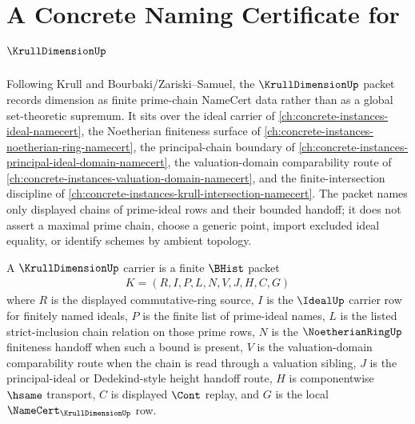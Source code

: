 \chapter{A Concrete Naming Certificate for $\KrullDimensionUp$}
\label{ch:concrete-instances-krull-dimension-namecert}

Following Krull and Bourbaki/Zariski--Samuel, the $\KrullDimensionUp$ packet records dimension as finite prime-chain NameCert data rather than as a global set-theoretic supremum. It sits over the ideal carrier of \autoref{ch:concrete-instances-ideal-namecert}, the Noetherian finiteness surface of \autoref{ch:concrete-instances-noetherian-ring-namecert}, the principal-chain boundary of \autoref{ch:concrete-instances-principal-ideal-domain-namecert}, the valuation-domain comparability route of \autoref{ch:concrete-instances-valuation-domain-namecert}, and the finite-intersection discipline of \autoref{ch:concrete-instances-krull-intersection-namecert}. The packet names only displayed chains of prime-ideal rows and their bounded handoff; it does not assert a maximal prime chain, choose a generic point, import excluded ideal equality, or identify schemes by ambient topology.

\begin{definition}\label{def:krull-dimension-carrier}
A $\KrullDimensionUp$ carrier is a finite $\BHist$ packet
$$
\begin{gathered}
K=(R,I,P,L,N,V,J,H,C,G)
\end{gathered}
$$
where $R$ is the displayed commutative-ring source, $I$ is the $\IdealUp$ carrier row for finitely named ideals, $P$ is the finite list of prime-ideal names, $L$ is the listed strict-inclusion chain relation on those prime rows, $N$ is the $\NoetherianRingUp$ finiteness handoff when such a bound is present, $V$ is the valuation-domain comparability route when the chain is read through a valuation sibling, $J$ is the principal-ideal or Dedekind-style height handoff route, $H$ is componentwise $\hsame$ transport, $C$ is displayed $\Cont$ replay, and $G$ is the local $\NameCert_{\KrullDimensionUp}$ row.
\end{definition}


